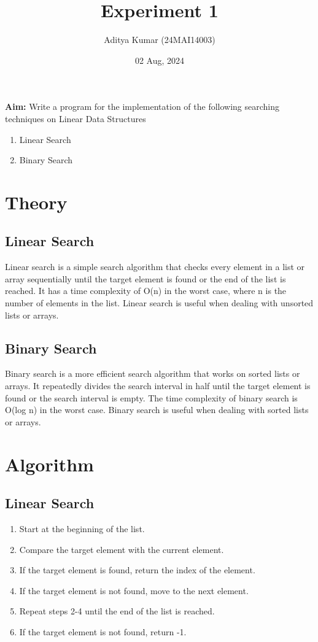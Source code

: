 \documentclass[12pt]{fphw}
\title{Experiment 1}
\author{Aditya Kumar (24MAI14003)\\}
\date{02 Aug, 2024}
\institute{Chandigarh University\\Master of Engineeing---Artificial Intelligence}
\begin{document}
\maketitle

\section*{}
\begin{problem}
  \textbf{Aim: }Write a program for the implementation of the following searching techniques on Linear Data Structures
  \begin{enumerate}
    \item Linear Search
    \item Binary Search
  \end{enumerate}
\end{problem}

\section{Theory}
\subsection{Linear Search}
Linear search is a simple search algorithm that checks every element in a list or array sequentially until the target element is found or the end of the list is reached. It has a time complexity of O(n) in the worst case, where n is the number of elements in the list. Linear search is useful when dealing with unsorted lists or arrays. 

\subsection{Binary Search}
Binary search is a more efficient search algorithm that works on sorted lists or arrays. It repeatedly divides the search interval in half until the target element is found or the search interval is empty. The time complexity of binary search is O(log n) in the worst case. Binary search is useful when dealing with sorted lists or arrays.

\section{Algorithm}
\subsection{Linear Search}
\begin{enumerate}
  \item Start at the beginning of the list.
  \item Compare the target element with the current element.
  \item If the target element is found, return the index of the element.
  \item If the target element is not found, move to the next element.
  \item Repeat steps 2-4 until the end of the list is reached.
  \item If the target element is not found, return -1.
\end{enumerate}
\end{document}
